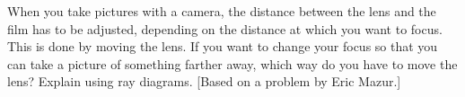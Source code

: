 When you take pictures with a camera, the distance
between the lens and the film has to be adjusted, depending
on the distance at which you want to focus. This is done by
moving the lens. If you want to change your focus so that
you can take a picture of something farther away, which way
do you have to move the lens? Explain using ray diagrams.
[Based on a problem by Eric Mazur.]
